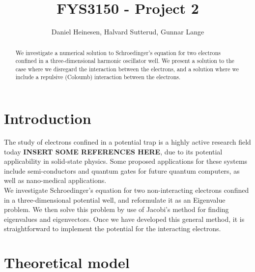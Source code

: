\documentclass[a4paper, 10pt]{article}
\title{FYS3150 - Project 2}
\author{Daniel Heinesen, Halvard Sutterud, Gunnar Lange}
\begin{document}
\maketitle
\begin{abstract}We investigate a numerical solution to Schroedinger's equation for two electrons confined in a three-dimensional harmonic oscillator well. We present a solution to the case where we disregard the interaction between the electrons, and a solution where we include a repulsive (Coloumb) interaction between the electrons. 
\end{abstract}

\tableofcontents

\section{Introduction}
The study of electrons confined in a potential trap is a highly active research field today \textbf{INSERT SOME REFERENCES HERE}, due to its potential applicability in solid-state physics. Some proposed applications for these systems include semi-conductors and quantum gates for future quantum computers, as well as nano-medical applications.\\
\linebreak
We investigate Schroedinger's equation for two non-interacting electrons confined in a three-dimensional potential well, and reformulate it as an Eigenvalue problem. We then solve this problem by use of Jacobi's method for finding eigenvalues and eigenvectors. Once we have developed this general method, it is straightforward to implement the potential for the interacting electrons.

\section{Theoretical model}\label{Theoretical_section}
\end{document}

